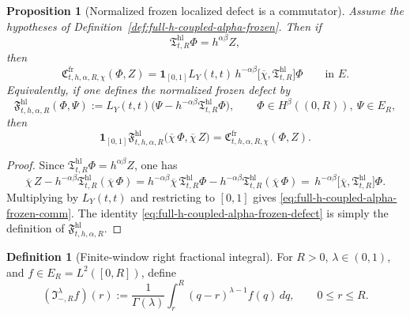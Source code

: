\documentclass[11pt,a4paper]{amsart}
\theoremstyle{plain}
\newtheorem{proposition}[theorem]{Proposition}
\theoremstyle{definition}
\newtheorem{definition}[theorem]{Definition}
\theoremstyle{remark}
\newcommand{\one}{\mathbf 1}
\begin{document}
\begin{proposition}[Normalized frozen localized defect is a commutator]
\label{prop:full-h-coupled-alpha-frozen}
Assume the hypotheses of Definition~\ref{def:full-h-coupled-alpha-frozen}. Then
if
\[
\mathfrak T_{t,R}^{\mathrm{hl}}\Phi=h^{\alpha\beta}Z,
\]
then
\begin{equation}\label{eq:full-h-coupled-alpha-frozen-comm}
\mathfrak C_{t,h,\alpha,R,\chi}^{\mathrm{fr}}(\Phi,Z)
=
\one_{[0,1]}L_Y(t,t)\,
h^{-\alpha\beta}
\bigl[
\overline\chi,\mathfrak T_{t,R}^{\mathrm{hl}}
\bigr]\Phi
\qquad\text{in }E.
\end{equation}
Equivalently, if one defines the normalized frozen defect by
\[
\mathfrak F_{t,h,\alpha,R}^{\mathrm{hl}}(\Phi,\Psi)
:=
L_Y(t,t)\bigl(\Psi-h^{-\alpha\beta}\mathfrak T_{t,R}^{\mathrm{hl}}\Phi\bigr),
\qquad
\Phi\in H^\beta((0,R)),\ \Psi\in E_R,
\]
then
\begin{equation}\label{eq:full-h-coupled-alpha-frozen-defect}
\one_{[0,1]}
\mathfrak F_{t,h,\alpha,R}^{\mathrm{hl}}
\bigl(
\overline\chi\,\Phi,
\overline\chi\,Z
\bigr)
=
\mathfrak C_{t,h,\alpha,R,\chi}^{\mathrm{fr}}(\Phi,Z).
\end{equation}
\end{proposition}

\begin{proof}
Since \(\mathfrak T_{t,R}^{\mathrm{hl}}\Phi=h^{\alpha\beta}Z\), one has
\[
\overline\chi\,Z-h^{-\alpha\beta}\mathfrak T_{t,R}^{\mathrm{hl}}(\overline\chi\,\Phi)
=
h^{-\alpha\beta}
\overline\chi\,\mathfrak T_{t,R}^{\mathrm{hl}}\Phi
-
h^{-\alpha\beta}\mathfrak T_{t,R}^{\mathrm{hl}}(\overline\chi\,\Phi)
=
\,
h^{-\alpha\beta}
\bigl[
\overline\chi,\mathfrak T_{t,R}^{\mathrm{hl}}
\bigr]\Phi.
\]
Multiplying by \(L_Y(t,t)\) and restricting to \([0,1]\) gives
\eqref{eq:full-h-coupled-alpha-frozen-comm}. The identity
\eqref{eq:full-h-coupled-alpha-frozen-defect} is simply the definition of
\(\mathfrak F_{t,h,\alpha,R}^{\mathrm{hl}}\).
\end{proof}

\begin{definition}[Finite-window right fractional integral]
\label{def:window-fractional-integral}
For \(R>0\), \(\lambda\in(0,1)\), and \(f\in E_R=L^2([0,R])\), define
\begin{equation}\label{eq:window-fractional-integral}
(\mathfrak I_{-,R}^{\lambda}f)(r)
:=
\frac{1}{\Gamma(\lambda)}
\int_r^R (q-r)^{\lambda-1}f(q)\,dq,
\qquad 0\le r\le R.
\end{equation}
\end{definition}
\end{document}
